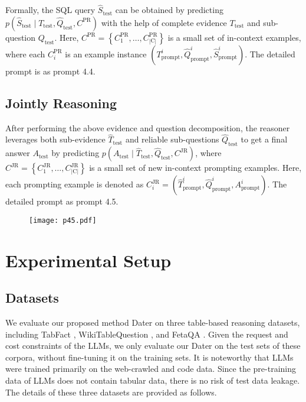 Formally, the SQL query $\hat{S}_{\text{test}}$ can be obtained by predicting $p(\hat{S}_\text{test} \mid T_{\text{test}}, \hat{Q}_{\text{test}}, C^{\text{PR}})$ with the help of complete evidence $T_{\text{test}}$ and sub-question $Q_{\text{test}}$. Here, 
$C^{\text{PR}}=\left\{C^{\text{PR}}_1, \ldots, C^{\text{PR}}_{|\text{C}|}\right\}$ is a small set of in-context examples, where each $C^{\text{PR}}_i$ is an example instance $(T_{\text{prompt}}^i, \hat{Q}_{\text{prompt}}^i, \hat{S}_{\text{prompt}}^i)$.
The detailed prompt is as prompt 4.4.

\subsection{Jointly Reasoning}
After performing the above evidence and question decomposition, the reasoner leverages both sub-evidence $\hat{T}_{\text{test}}$ and reliable sub-questions $\hat{Q}_{\text{test}}$ to get a final answer $A_{\text{test}}$ by predicting $p(A_{\text{test}} \mid \hat{T}_{\text{test}}, \hat{Q}_{\text{test}}, C^{\text{JR}})$, where $C^{\text{JR}}=\left\{C^{\text{JR}}_1, \ldots, C^{\text{JR}}_{|\text{C}|}\right\}$ is a small set of new in-context prompting examples. Here, each prompting example is denoted as $C^{\text{JR}}_i = (\hat{T}_{\text{prompt}}^i, \hat{Q}_{\text{prompt}}^i, A_{\text{prompt}}^i)$.
The detailed prompt as prompt 4.5.
\begin{figure}
    \centering
    \texttt{[image: p45.pdf]}
    \label{p45}
\end{figure}

\section{Experimental Setup}

\subsection{Datasets}
We evaluate our proposed method Dater on three table-based reasoning datasets, including TabFact \citep{tabfact}, WikiTableQuestion \citep{wtq}, and FetaQA \citep{fetaqa}. 
Given the request and cost constraints of the LLMs, we only evaluate our Dater on the test sets of these corpora, without fine-tuning it on the training sets. 
It is noteworthy that LLMs were trained primarily on the web-crawled and code data. 
Since the pre-training data of LLMs does not contain tabular data, there is no risk of test data leakage. 
The details of these three datasets are provided as follows.

